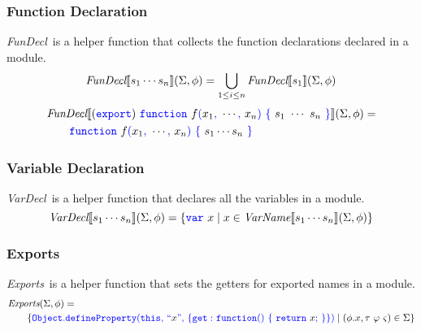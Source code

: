\documentclass[a4paper]{article}
\newcommand{\code}[1]{\textcolor{blue}{\tt #1}}
\newcommand{\VarName}{\emph{VarName}}
\newcommand{\FunDecl}{\emph{FunDecl}}
\newcommand{\VarDecl}{\emph{VarDecl}}
\newcommand{\Exports}{\emph{Exports}}
\begin{document}
\subsubsection{Function Declaration}
\FunDecl\ is a helper function that collects the function declarations declared in a module.
\begin{equation*}
\FunDecl \llbracket s_1 \cdots s_n \rrbracket (\Sigma, \phi) = \bigcup_{1 \le i \le n} \FunDecl \llbracket s_1 \rrbracket (\Sigma, \phi)
\end{equation*}
\begin{equation*}
\begin{split}
&\FunDecl \llbracket (\code{export})\ \code{function}\ f\code{(}x_1\code{,}\ \cdots\code{,}\ x_n\code{)}\ \code{\{}\ s_1\ \cdots\ s_n\ \code{\}} \rrbracket (\Sigma, \phi) = \\
&\qquad \code{function}\ f\code{(}x_1\code{,}\ \cdots\code{,}\ x_n\code{)}\ \code{\{}\ s_1 \cdots s_n\ \code{\}}
\end{split}
\end{equation*}

\subsubsection{Variable Declaration}
\VarDecl\ is a helper function that declares all the variables in a module.
\begin{equation*}
\VarDecl \llbracket s_1 \cdots s_n \rrbracket (\Sigma, \phi) = \{ \code{var}\ x \mid x \in \VarName \llbracket s_1 \cdots s_n \rrbracket (\Sigma, \phi) \}
\end{equation*}

\subsubsection{Exports}
\Exports\ is a helper function that sets the getters for exported names in a module.
\begin{equation*}
\begin{split}
&\Exports (\Sigma, \phi) = \\
&\qquad \{ \code{Object.defineProperty(this,}\ \code{``}x\code{",}\ \code{\{get:}\ \code{function()}\ \code{\{}\ \code{return}\ x\code{;}\ \code{\}\})} \mid (\phi.x, \tau\ \varphi\ \varsigma) \in \Sigma \}
\end{split}
\end{equation*}
\end{document}
